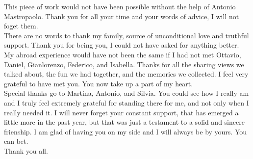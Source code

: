 \begin{acknowledgements}
This piece of work would not have been possible without the help of Antonio Mastropaolo. 
Thank you for all your time and your words of advice, I will not foget them.\\
\newline
There are no words to thank my family, source of unconditional love and truthful support. 
Thank you for being you, I could not have asked for anything better.\\
\newline
My abroad experience would have not been the same if I had not met Ottavio, Daniel, Gianlorenzo, Federico, and Isabella. 
Thanks for all the sharing views we talked about, the fun we had together, and the memories we collected. I feel very grateful to have met you.
You now take up a part of my heart.\\
\newline
Special thanks go to Martina, Antonio, and Silvia. 
You could see how I really am and I truly feel extremely grateful 
for standing there for me, and not only when I really needed it. 
I will never forget your constant support, that has emerged a little more in the past year, but that was 
just a testament to a solid and sincere frienship. I am glad of having you on my side and I will always be by yours.
You can bet.\\
\newline
Thank you all.
\end{acknowledgements}